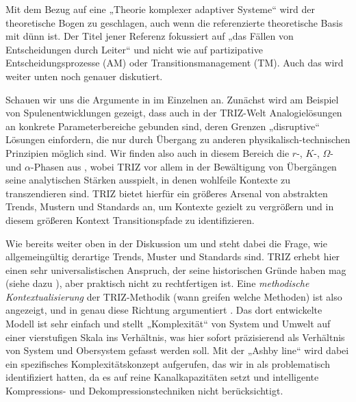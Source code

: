 \documentclass[12pt,a4paper]{article}
\begin{document}
Mit dem Bezug auf eine „Theorie komplexer adaptiver Systeme“ wird der
theoretische Bogen zu \cite{Foxon2009} geschlagen, auch wenn die referenzierte
theoretische Basis mit \cite{Snowden2007} dünn ist.  Der Titel jener Referenz
fokussiert auf „das Fällen von Entscheidungen durch Leiter“ und nicht wie
\cite{Foxon2009} auf partizipative Entscheidungsprozesse (AM) oder
Transitionsmanagement (TM).  Auch das wird weiter unten noch genauer
diskutiert.

Schauen wir uns die Argumente in \cite{Mann2019} im Einzelnen an.  Zunächst
wird am Beispiel von Spulenentwicklungen gezeigt, dass auch in der TRIZ-Welt
Analogielösungen an konkrete Parameterbereiche gebunden sind, deren Grenzen
„disruptive“ Lösungen einfordern, die nur durch Übergang zu anderen
physikalisch-technischen Prinzipien möglich sind. Wir finden also auch in
diesem Bereich die $r$-, $K$-, $\Omega$- und $\alpha$-Phasen aus
\cite{Holling2001}, wobei TRIZ vor allem in der Bewältigung von Übergängen
seine analytischen Stärken ausspielt, in denen wohlfeile Kontexte zu
transzendieren sind. TRIZ bietet hierfür ein größeres Arsenal von abstrakten
Trends, Mustern und Standards an, um Kontexte gezielt zu vergrößern und in
diesem größeren Kontext Transitionspfade zu identifizieren.

Wie bereits weiter oben in der Diskussion um \cite{Geels2007} und
\cite{Foxon2009} steht dabei die Frage, wie allgemeingültig derartige Trends,
Muster und Standards sind.  TRIZ erhebt hier einen sehr universalistischen
Anspruch, der seine historischen Gründe haben mag (siehe dazu
\cite{Gerovitch1996}), aber praktisch nicht zu rechtfertigen ist. Eine
\emph{methodische Kontextualisierung} der TRIZ-Methodik (wann greifen welche
Methoden) ist also angezeigt, und in genau diese Richtung argumentiert
\cite{Mann2019}. Das dort entwickelte Modell ist sehr einfach und stellt
„Komplexität“ von System und Umwelt auf einer vierstufigen Skala ins
Verhältnis, was hier sofort präzisierend als Verhältnis von System und
Obersystem gefasst werden soll. Mit der „Ashby line“ wird dabei ein
spezifisches Komplexitätskonzept aufgerufen, das wir in \cite{Graebe2020a} als
problematisch identifiziert hatten, da es auf reine Kanalkapazitäten setzt und
intelligente Kompressions- und Dekompressionstechniken nicht berücksichtigt.
\end{document}
